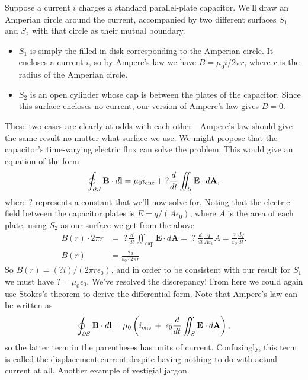 \documentclass[../p051main.tex]{subfiles}
\begin{document}
Suppose a current $i$ charges a standard parallel-plate capacitor.
We'll draw an Amperian circle around the current, accompanied by two different surfaces $S_1$ and $S_2$ with that circle as their mutual boundary.
\begin{itemize}
    \item $S_1$ is simply the filled-in disk corresponding to the Amperian circle.
    It encloses a current $i$, so by Ampere's law we have $B = \mu_0 i / 2\pi r$, where $r$ is the radius of the Amperian circle.

    \item $S_2$ is an open cylinder whose cap is between the plates of the capacitor.
    Since this surface encloses no current, our version of Ampere's law gives $B = 0$.
\end{itemize}
These two cases are clearly at odds with each other---Ampere's law should give the same result no matter what surface we use.
We might propose that the capacitor's time-varying electric flux can solve the problem.
This would give an equation of the form
\[ \oint_{\partial S} \mathbf{B} \cdot d\mathbf{l} = \mu_0 i_\textrm{enc} \,+\; ? \frac{d}{dt} \iint_S \mathbf{E} \cdot d\mathbf{A}, \]
where $?$ represents a constant that we'll now solve for.
Noting that the electric field between the capacitor plates is $E = q / (A \epsilon_0)$, where $A$ is the area of each plate, using $S_2$ as our surface we get from the above
\begin{align*}
    B(r) \cdot 2 \pi r &= \;?\, \frac{d}{dt} \iint_\textrm{cap} \mathbf{E} \cdot d\mathbf{A} = \;?\, \frac{d}{dt} \frac{q}{A \varepsilon_0} A = \frac{?}{\varepsilon_0} \frac{dq}{dt}. \\
    B(r) &= \frac{?\, i}{\varepsilon_0 \cdot 2 \pi r}
\end{align*}
So $B(r) = (? i) / (2\pi r \epsilon_0)$, and in order to be consistent with our result for $S_1$ we must have $? = \mu_0 \epsilon_0$.
We've resolved the discrepancy!
From here we could again use Stokes's theorem to derive the differential form.
Note that Ampere's law can be written as
\[ \oint_{\partial S} \mathbf{B} \cdot d\mathbf{l} = \mu_0 \left( i_\textrm{enc} \,+\; \epsilon_0 \frac{d}{dt} \iint_S \mathbf{E} \cdot d\mathbf{A} \right), \]
so the latter term in the parentheses has units of current.
Confusingly, this term is called the displacement current despite having nothing to do with actual current at all.
Another example of vestigial jargon.
\end{document}
